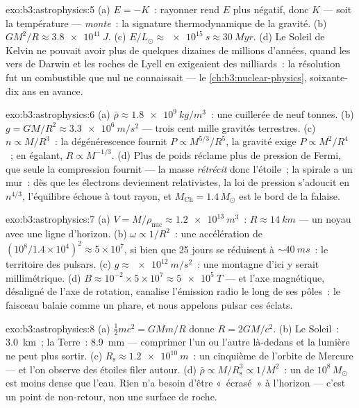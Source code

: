 \begin{solution}{exo:b3:astrophysics:5}
(a) $E = -K$~: rayonner rend $E$ plus négatif, donc $K$ --- soit la
température --- \emph{monte}~: la signature thermodynamique de la
gravité. (b) $GM^2/R \approx \qty{3.8e41}{J}$. (c)
$E/L_\odot \approx \qty{e15}{s} \approx \qty{30}{Myr}$. (d)
Le Soleil de Kelvin ne pouvait avoir plus de quelques dizaines de
millions d'années, quand les vers de Darwin et les roches de Lyell
en exigeaient des milliards~: la résolution fut un combustible que
nul ne connaissait --- le \cref{ch:b3:nuclear-physics}, soixante-dix
ans en avance.
\end{solution}

\begin{solution}{exo:b3:astrophysics:6}
(a) $\bar\rho \approx \qty{1.8e9}{kg/m^3}$~: une cuillerée de neuf
tonnes. (b) $g = GM/R^2 \approx \qty{3.3e6}{m/s^2}$ --- trois cent
mille gravités terrestres. (c) $n \propto M/R^3$~: la dégénérescence
fournit $P \propto M^{5/3}/R^5$, la gravité exige
$P \propto M^2/R^4$~; en égalant, $R \propto M^{-1/3}$. (d) Plus de
poids réclame plus de pression de Fermi, que seule la compression
fournit --- la masse \emph{rétrécit} donc l'étoile~; la spirale a un
mur~: dès que les électrons deviennent relativistes, la loi de
pression s'adoucit en $n^{4/3}$, l'équilibre échoue à tout rayon, et
$M_{\text{Ch}} = 1.4\,M_\odot$ est le bord de la falaise.
\end{solution}

\begin{solution}{exo:b3:astrophysics:7}
(a) $V = M/\rho_{\text{nuc}} \approx \qty{1.2e13}{m^3}$~:
$R \approx \qty{14}{km}$ --- un noyau avec une ligne d'horizon. (b)
$\omega \propto 1/R^2$~: une accélération de $(10^8/1.4\times10^4)^2
\approx 5\times10^{7}$, si bien que 25 jours se réduisent à
${\sim}\qty{40}{ms}$~: le territoire des pulsars. (c) $g \approx
\qty{e12}{m/s^2}$~: une montagne d'ici y serait millimétrique.
(d) $B \approx 10^{-2}\times5\times10^{7} \approx
\qty{5e5}{T}$ --- et l'axe magnétique, désaligné de l'axe de
rotation, canalise l'émission radio le long de ses pôles~: le
faisceau balaie comme un phare, et nous appelons pulsar ces éclats.
\end{solution}

\begin{solution}{exo:b3:astrophysics:8}
(a) $\tfrac12mc^2 = GMm/R$ donne $R = 2GM/c^2$. (b) Le Soleil~:
\qty{3.0}{km}~; la Terre~: \qty{8.9}{mm} --- comprimer l'un ou
l'autre là-dedans et la lumière ne peut plus sortir. (c) $R_{\text{s}} \approx
\qty{1.2e10}{m}$~: un cinquième de l'orbite de Mercure --- et l'on
observe des étoiles filer autour. (d) $\bar\rho \propto
M/R_{\text{s}}^3 \propto 1/M^2$~: un  de
$10^8\,M_\odot$ est moins dense que l'eau. Rien n'a besoin d'être
«~écrasé~» à l'horizon --- c'est un point de non-retour, non une
surface de roche.
\end{solution}

